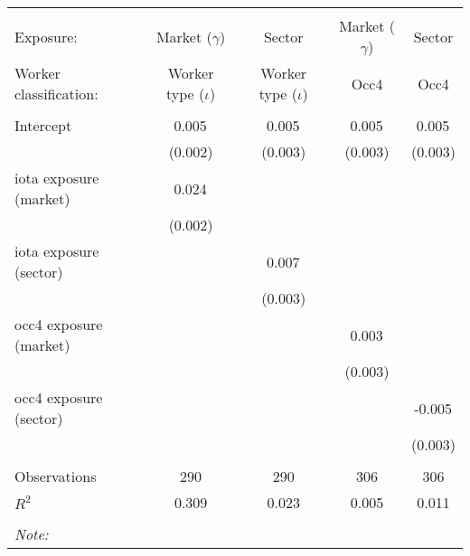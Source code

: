 \begin{tabular}{@{\extracolsep{5pt}}lcccc}
\\[-1.8ex]\hline
\hline \\[-1.8ex]
\hline \\[-1.8ex]
 Exposure: & Market ($\gamma$) & Sector & Market ($\gamma$) & Sector \\
 Worker classification: & Worker type ($\iota$) & Worker type ($\iota$) & Occ4 & Occ4 \\
 \hline &  &  &  &  \\
 Intercept & 0.005$^{}$ & 0.005$^{}$ & 0.005$^{}$ & 0.005$^{}$ \\
  & (0.002) & (0.003) & (0.003) & (0.003) \\
 iota exposure (market) & 0.024$^{}$ & & & \\
  & (0.002) & & & \\
 iota exposure (sector) & & 0.007$^{}$ & & \\
  & & (0.003) & & \\
 occ4 exposure (market) & & & 0.003$^{}$ & \\
  & & & (0.003) & \\
 occ4 exposure (sector) & & & & -0.005$^{}$ \\
  & & & & (0.003) \\
\hline \\[-1.8ex]
 Observations & 290 & 290 & 306 & 306 \\
 $R^2$ & 0.309 & 0.023 & 0.005 & 0.011 \\
\hline
\hline \\[-1.8ex]
\textit{Note:}\end{tabular}